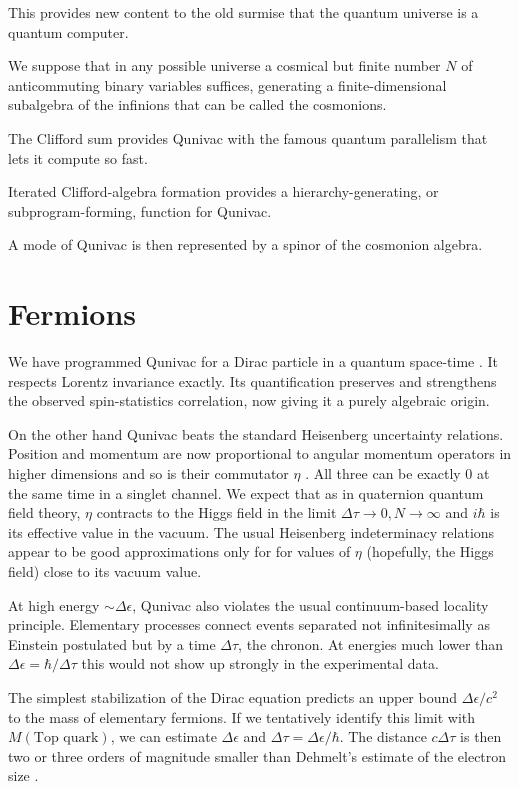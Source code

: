 \documentclass[a4paper,11pt]{article}
\begin{document}
This provides new 
content
to the old surmise \cite{FINKELSTEIN1969}
that  the quantum universe is a quantum computer.

We suppose that in any possible universe
a cosmical but finite number
$N$ of anticommuting
binary variables
suffices,
generating a finite-dimensional
subalgebra of the infinions
that can be called the cosmonions.

The Clifford sum provides  Qunivac 
with the famous quantum parallelism
that lets it compute so fast.

Iterated Clifford-algebra formation provides a
hierarchy-generating,
or  subprogram-forming,
function for Qunivac.

A mode of Qunivac is then represented by a  spinor
of the cosmonion algebra.

\section{Fermions}

We have programmed Qunivac for a
Dirac particle 
in a quantum space-time \cite{GALIA}.
It
respects Lorentz invariance exactly.
Its quantification
preserves  and strengthens 
the observed spin-statistics correlation,
now
giving it
 a purely algebraic origin.

On the other hand  Qunivac beats
 the standard Heisenberg uncertainty relations.
Position and momentum are now
proportional to angular momentum operators
in higher dimensions
and so is their commutator  $\eta$ \cite{GALIA}.
All three can be exactly 0
at the same time
in a singlet channel.
We expect that as in quaternion quantum field theory,
$\eta$ contracts to the  Higgs field 
in the limit $\Delta \tau\to 0, N\to \infty$
and $i\hbar$ is its effective value
in the vacuum.
The usual Heisenberg indeterminacy relations 
appear to be good
approximations only for  
for values of $\eta$ (hopefully,
the Higgs field)
close to its vacuum value.

At high energy 
$\sim \Delta\epsilon$\/,
Qunivac also violates
 the usual continuum-based locality
principle.
Elementary processes connect
events separated 
not infinitesimally as Einstein postulated but by 
a time $\Delta \tau$, the chronon.
At energies much lower than $\Delta \epsilon=\hbar /\Delta \tau$
 this would not 
show up strongly in the experimental data.

The simplest stabilization of the Dirac equation
predicts an upper bound $\Delta \epsilon/c^2$
to the mass of elementary fermions.
If we tentatively identify
this limit with  $ M(\mbox{Top quark})$,
we can estimate
$\Delta \epsilon$ and  $\Delta \tau = \Delta \epsilon/\hbar$.
The distance $c\Delta \tau$
is then  two or  three orders of magnitude smaller 
than Dehmelt's estimate
of the electron size
\cite{DEHMELT}.
\end{document}
